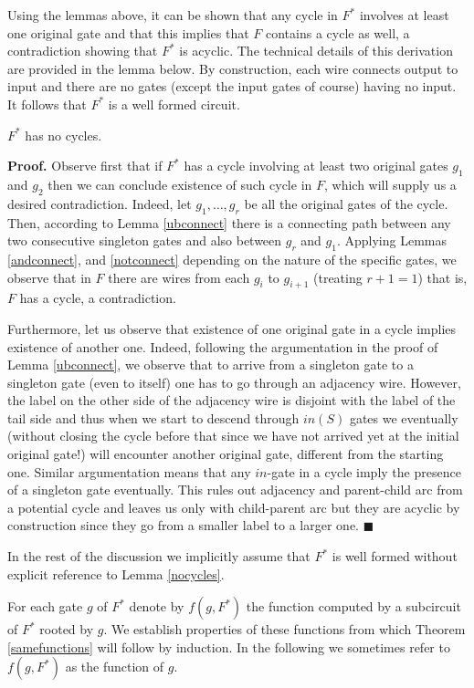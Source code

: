 \documentclass{llncs}
\begin{document}
Using the lemmas above, it can be shown that any cycle in $F^*$ involves at least one original
gate and that this implies that $F$ contains a cycle as well, a contradiction showing that
$F^*$ is acyclic. The technical details of this derivation are provided in the lemma below. 
By construction, each wire connects output to input 
and there are no gates (except the input gates of course) having no input.
It follows that $F^*$ is a well formed circuit.


\begin{lemma} \label{nocycles}
$F^*$ has no cycles.
\end{lemma} 

{\bf Proof.} Observe first that if $F^*$ has a cycle involving at least two original gates $g_1$ and $g_2$
then we can conclude existence of such cycle in $F$, which will supply us a desired contradiction. 
Indeed, let $g_1, \dots, g_r$ be all the original gates of the cycle. Then, according to Lemma \ref{ubconnect} there is a connecting path between any two consecutive singleton gates and also between $g_r$ and $g_1$. Applying Lemmas \ref{andconnect}, and
\ref{notconnect} depending on the nature of the specific gates, we observe that in $F$ there are wires from each $g_i$ to $g_{i+1}$ (treating $r+1=1$) that is, $F$ has a cycle, a contradiction.

Furthermore, let us observe that existence of one original gate in a cycle implies existence of another one. Indeed, 
following the argumentation in the proof of Lemma \ref{ubconnect}, we observe that to arrive from a singleton gate to a singleton gate (even to itself) one has to go through an adjacency wire. However, the label on the other side of the adjacency wire is disjoint with the label of the tail side and thus when we start to descend through $in(S)$ gates we eventually (without closing the cycle before that since we have not arrived yet at the initial original gate!) will encounter another original gate, different from the starting one. Similar argumentation means that any $in$-gate in a cycle imply the presence of a singleton gate eventually. This rules out adjacency and parent-child arc from a potential cycle and leaves us only with child-parent arc but they are acyclic by construction since they go from a smaller label to a larger one. $\blacksquare$

In the rest of the discussion we implicitly assume that $F^*$ is well formed without explicit reference to Lemma \ref{nocycles}.


For each gate $g$ of $F^*$ denote by $f(g,F^*)$ the function
computed by a subcircuit of $F^*$ rooted by $g$. We establish properties of these functions from which
Theorem \ref{samefunctions} will follow by induction. 
In the following we sometimes refer to $f(g,F^*)$  as the function of $g$.
\end{document}
